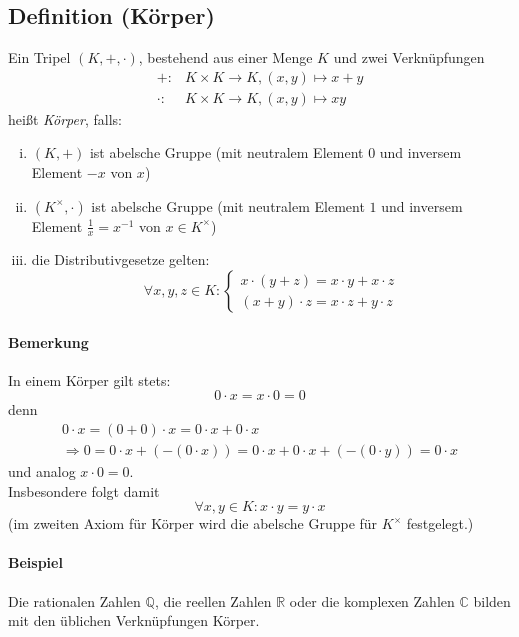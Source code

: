 \subsection{Definition (Körper)}
	\begin{Definition}[Körper]
		Ein Tripel $(K,+,\cdot)$, bestehend aus einer Menge $K$ und zwei Verknüpfungen
                \begin{align*}
                        +:&K\times K\to K,(x,y)\mapsto x+y\\
                        \cdot : &K\times K\to K, (x,y)\mapsto xy
                \end{align*}
                heißt \emph{Körper}, falls:
                \begin{enumerate}[(i)]
                        \item $(K,+)$ ist abelsche Gruppe (mit neutralem Element $0$ und inversem Element $-x$ von $x$)
                        \item $(K^\times,\cdot)$ ist abelsche Gruppe (mit neutralem Element $1$ und inversem Element $\frac{1}{x} = x^{-1}$ von $x\in K^\times$)
                        \item die Distributivgesetze gelten:
                                \[ \forall x,y,z\in K :\begin{cases}x\cdot (y+z) = x\cdot y+x\cdot z\\ (x+y)\cdot z = x\cdot z+y\cdot z \end{cases} \]
                \end{enumerate}
	\end{Definition}

\paragraph{Bemerkung}
	In einem Körper gilt stets:
		\[0\cdot x = x\cdot 0 = 0\]
        denn
		\begin{gather*}
		0\cdot x = (0+0)\cdot x = 0\cdot x + 0\cdot x \\
		\Rightarrow 0 = 0\cdot x + (-(0\cdot x)) = 0\cdot x + 0\cdot x + (-(0\cdot y)) = 0\cdot x
		\end{gather*}
	und analog $x\cdot 0 = 0$.\\
	Insbesondere folgt damit 
	\[\forall x,y\in K: x\cdot y = y\cdot x\]
	(im zweiten Axiom für Körper wird die abelsche Gruppe für $K^\times$ festgelegt.)
	
\paragraph{Beispiel}
	Die rationalen Zahlen $\mathbb{Q}$, die reellen Zahlen $\mathbb{R}$ oder die komplexen Zahlen $\mathbb{C}$ bilden mit den üblichen Verknüpfungen Körper.

